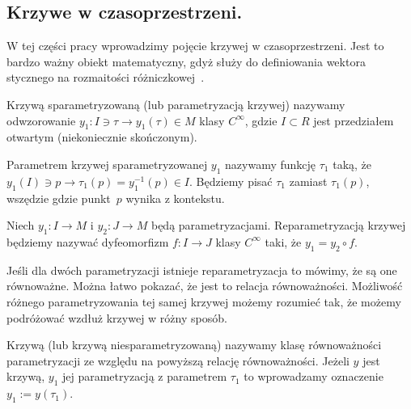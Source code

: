\subsection{Krzywe w czasoprzestrzeni.}
W tej części pracy wprowadzimy pojęcie krzywej w czasoprzestrzeni. 
Jest to bardzo ważny obiekt matematyczny, gdyż służy do definiowania
wektora stycznego na rozmaitości różniczkowej~\cite{ganca1987}. 
\begin{definition}
Krzywą sparametryzowaną (lub parametryzacją krzywej) nazywamy 
odwzorowanie 
$ y_1 : I \ni \tau \to y_1(\tau) \in M$ klasy $C^\infty$, 
gdzie $I \subset R$ 
jest przedziałem otwartym (niekoniecznie skończonym).
\end{definition}
\begin{definition}
Parametrem krzywej sparametryzowanej $y_1$ 
nazywamy funkcję $\tau_1$ taką, że $ y_1(I) \ni p 
\to \tau_1(p) = y_1^{-1}( p )\in I$. 
Będziemy pisać
$\tau_1$ zamiast $\tau_1(p)$, wszędzie gdzie punkt~$p$ 
wynika z kontekstu.
\end{definition}
\begin{definition}
Niech $y_1: I \to M$ i $y_2:J\to M$ będą parametryzacjami.
Reparametryzacją krzywej będziemy nazywać dyfeomorfizm $f : I \to J$
klasy $C^\infty$
taki, że $y_1 = y_2 \circ f$.
\end{definition}
Jeśli dla dwóch parametryzacji istnieje reparametryzacja to 
mówimy, że są one równoważne. Można łatwo pokazać, że jest to
relacja równoważności. Możliwość różnego parametryzowania tej 
samej krzywej możemy rozumieć tak, że możemy podróżować wzdłuż
krzywej w różny sposób.
\begin{definition}
Krzywą (lub krzywą niesparametryzowaną) nazywamy klasę równoważności
parametryzacji ze względu na powyższą relację równoważności.
Jeżeli $y$ jest krzywą, $y_1$ jej parametryzacją z parametrem $\tau_1$
to wprowadzamy oznaczenie $y_1 := y(\tau_1)$.
\end{definition}
